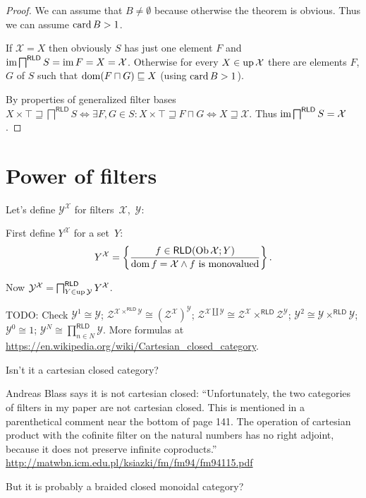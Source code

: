 \begin{proof}
  We can assume that $B \neq \emptyset$ because otherwise the theorem is
  obvious. Thus we can assume $\operatorname{card} B>1$.

  If $\mathcal{X} = X$ then obviously $S$ has just one element $F$ and
  $\operatorname{im} \bigsqcap^{\mathsf{RLD}} S = \operatorname{im} F = X =
  \mathcal{X}$. Otherwise for every $X \in \operatorname{up} \mathcal{X}$ there are
  elements $F$, $G$ of $S$ such that $\operatorname{dom} (F \sqcap G) \sqsubseteq X$
  (using $\operatorname{card} B > 1$).
  
  By properties of generalized filter bases $X \times \top \sqsupseteq
  \bigsqcap^{\mathsf{RLD}} S \Leftrightarrow \exists F, G \in S : X
  \times \top \sqsupseteq F \sqcap G \Leftrightarrow X \sqsupseteq
  \mathcal{X}$. Thus $\operatorname{im} \bigsqcap^{\mathsf{RLD}} S =
  \mathcal{X}$.
\end{proof}

\section{Power of filters}

Let's define $\mathcal{Y}^{\mathcal{X}}$ for filters~$\mathcal{X}$,~$\mathcal{Y}$:

First define $Y^{\mathcal{X}}$ for a set~$Y$:
\[ Y^{\mathcal{X}} = \left\{ \frac{ f \in \mathsf{RLD} (\operatorname{Ob} \mathcal{X}
   ; Y) }{ \operatorname{dom} f = \mathcal{X} \wedge f\text{ is monovalued} }\right\} . \]

Now $\mathcal{Y}^{\mathcal{X}} = \bigsqcap^{\mathsf{RLD}}_{Y \in
\operatorname{up} \mathcal{Y}} Y^{\mathcal{X}}$.

TODO: Check $\mathcal{Y}^1 \cong \mathcal{Y}$; $\mathcal{Z}^{\mathcal{X}
\times^{\mathsf{RLD}} \mathcal{Y}} \cong
(\mathcal{Z}^{\mathcal{X}})^{\mathcal{Y}}$; $\mathcal{Z}^{\mathcal{X} \amalg
\mathcal{Y}} \cong \mathcal{Z}^{\mathcal{X}} \times^{\mathsf{RLD}}
\mathcal{Z}^{\mathcal{Y}}$; $\mathcal{Y}^2 \cong \mathcal{Y}\times^{\mathsf{RLD}}\mathcal{Y}$;
$\mathcal{Y}^0 \cong 1$; $\mathcal{Y}^N \cong \prod^{\mathsf{RLD}}_{n\in N}\mathcal{Y}$.
More formulas at \url{https://en.wikipedia.org/wiki/Cartesian_closed_category}.

Isn't it a cartesian closed category?

Andreas Blass says it is not cartesian closed: ``Unfortunately, the two categories of filters in my paper are
not cartesian closed.  This is mentioned in a parenthetical comment
near the bottom of page 141.  The operation of cartesian product with
the cofinite filter on the natural numbers has no right adjoint,
because it does not preserve infinite coproducts.''
\url{http://matwbn.icm.edu.pl/ksiazki/fm/fm94/fm94115.pdf}

But it is probably a braided closed monoidal category?